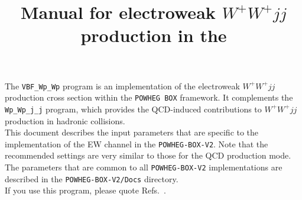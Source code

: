 \documentclass[a4paper,11pt]{article}
\title{Manual for electroweak $W^+W^+ jj$ production in the \POWHEGBOXV{}}
\date{}
\newcommand\POWHEGBOXV{{\tt POWHEG-BOX-V2}}
\def\pbox{{\tt POWHEG BOX}}
\begin{document}
\maketitle
%
\noindent
The {\tt VBF\_Wp\_Wp} program is an implementation of the electroweak
$W^+W^+ jj$ production cross section within the \pbox{} framework. It
complements the {\tt Wp\_Wp\_j\_j} program, which provides the
QCD-induced contributions to $W^+W^+ jj$ production in hadronic
collisions.
\\[2ex]
This document describes the input parameters that are specific to the
implementation of the EW channel in the \POWHEGBOXV. Note that the recommended settings
are very similar to those for the QCD production mode.  The parameters
that are common to all \POWHEGBOXV{} implementations are described in the {\tt POWHEG-BOX-V2/Docs}
directory.
\\[2ex]
If you use this program, please quote
Refs.~\cite{Jager:2009xx,JZ,Alioli:2010xd}.
\end{document}
